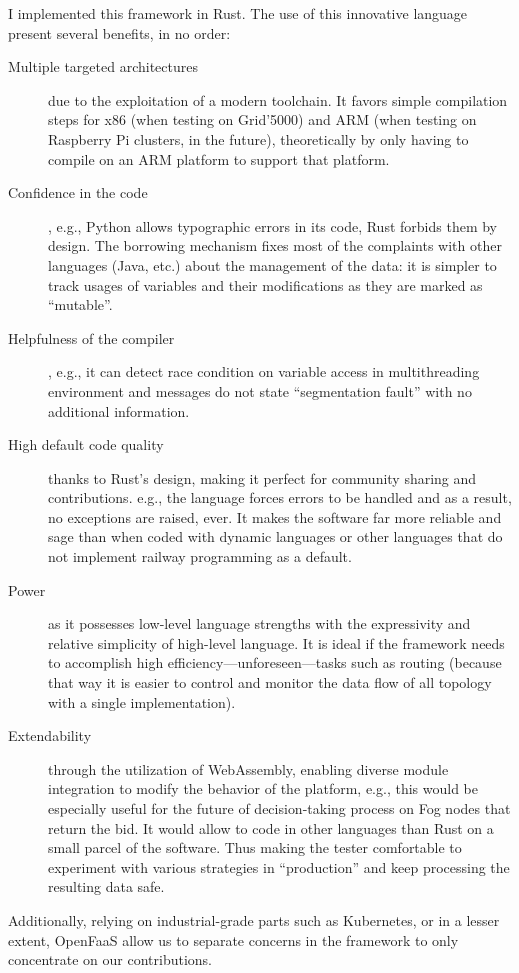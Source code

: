 I implemented this framework in Rust. The use of this innovative language present several benefits, in no order:
\begin{description}
	\item[Multiple targeted architectures]due to the exploitation of a modern toolchain. It favors simple compilation steps for x86 (when testing on Grid’5000) and ARM (when testing on Raspberry Pi clusters, in the future), theoretically by only having to compile on an ARM platform to support that platform.
	\item[Confidence in the code], e.g., Python allows typographic errors in its code, Rust forbids them by design. The borrowing mechanism fixes most of the complaints with other languages (Java, etc.) about the management of the data: it is simpler to track usages of variables and their modifications as they are marked as “mutable”.
	\item[Helpfulness of the compiler], e.g., it can detect race condition on variable access in multithreading environment and messages do not state “segmentation fault” with no additional information.
	\item[High default code quality]thanks to Rust's design, making it perfect for community sharing and contributions. e.g., the language forces errors to be handled and as a result, no exceptions are raised, ever. It makes the software far more reliable and sage than when coded with dynamic languages or other languages that do not implement railway programming as a default.
	\item[Power]as it possesses low-level language strengths with the expressivity and relative simplicity of high-level language. It is ideal if the framework needs to accomplish high efficiency—unforeseen—tasks such as routing (because that way it is easier to control and monitor the data flow of all topology with a single implementation).
	\item[Extendability]through the utilization of WebAssembly, enabling diverse module integration to modify the behavior of the platform, e.g., this would be especially useful for the future of decision-taking process on Fog nodes that return the bid. It would allow to code in other languages than Rust on a small parcel of the software. Thus making the tester comfortable to experiment with various strategies in “production” and keep  processing the resulting data safe.
\end{description}

Additionally, relying on industrial-grade parts such as Kubernetes, or in a lesser extent, OpenFaaS allow us to separate concerns in the framework to only concentrate on our contributions. 

